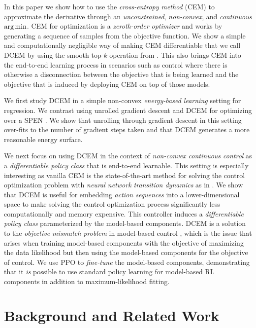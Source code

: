 \documentclass{article}
\begin{document}
In this paper we show how to use the \emph{cross-entropy method} (CEM)
\citep{rubinstein1997optimization,de2005tutorial}
to approximate the derivative through an
\emph{unconstrained}, \emph{non-convex}, and \emph{continuous}
$\operatorname*{arg\,min}$.
CEM for optimization is a \emph{zeroth-order optimizer} and works by
generating a sequence of samples from the objective function.
We show a simple and computationally negligible
way of making CEM differentiable that we call DCEM
by using the smooth top-$k$ operation from \citet{amos2019limited}.
This also brings CEM into the end-to-end learning process in scenarios
such as control where there is otherwise a disconnection between the
objective that is being learned and the objective that is induced by
deploying CEM on top of those models.

We first study DCEM in a simple non-convex
\emph{energy-based learning} setting for regression.
We contrast using unrolled gradient descent and DCEM
for optimizing over a SPEN \citep{belanger2016structured}.
We show that unrolling through gradient descent in this
setting over-fits to the number of gradient steps taken
and that DCEM generates a more reasonable energy surface.

We next focus on using DCEM in
the context of \emph{non-convex continuous control}
as a \emph{differentiable policy class} that is end-to-end learnable.
This setting is especially interesting as vanilla CEM is
the state-of-the-art method for solving the
control optimization problem with \emph{neural network transition dynamics}
as in \citet{chua2018deep,hafner2018learning}.
We show that DCEM is useful for embedding \emph{action sequences}
into a lower-dimensional space to make solving the
control optimization process significantly less
computationally and memory expensive.
This controller induces a \emph{differentiable policy class}
parameterized by the model-based components.
DCEM is a solution to the
\emph{objective mismatch problem}
in model-based control \citep{lambert2020objective},
which is the issue that arises when training model-based components with
the objective of maximizing the data likelihood but then using the
model-based components for the objective of control.
We use PPO \citep{schulman2017proximal} to
\emph{fine-tune} the model-based components, demonstrating that it \emph{is}
possible to use standard policy learning for model-based RL components in
addition to maximum-likelihood fitting.

\section{Background and Related Work}
\end{document}
